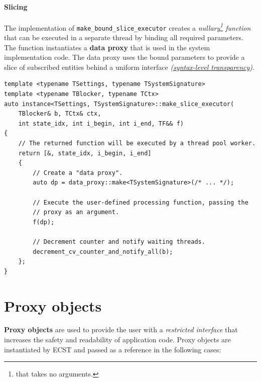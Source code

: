 \documentclass[twoside, 12pt, a4paper, openany]{book}
\begin{document}
\hypertarget{inner_par_slicing}{\subsubsection{Slicing}\label{inner_par_slicing}}

The implementation of
\texttt{make_bound_slice_executor}
creates a \emph{nullary\footnote{that takes no arguments.} function}
that can be executed in a separate thread by binding all required
parameters. The function instantiates a \textbf{data proxy} that is used
in the system implementation code. The data proxy uses the bound
parameters to provide a slice of subscribed entities behind a uniform
interface
\emph{(\protect\hyperlink{ecstoverview_syntaxtransp}{syntax-level
transparency})}.

\begin{verbatim}
template <typename TSettings, typename TSystemSignature>
template <typename TBlocker, typename TCtx>
auto instance<TSettings, TSystemSignature>::make_slice_executor(
    TBlocker& b, TCtx& ctx,
    int state_idx, int i_begin, int i_end, TF&& f)
{
    // The returned function will be executed by a thread pool worker.
    return [&, state_idx, i_begin, i_end]
    {
        // Create a "data proxy".
        auto dp = data_proxy::make<TSystemSignature>(/* ... */);

        // Execute the user-defined processing function, passing the
        // proxy as an argument.
        f(dp);

        // Decrement counter and notify waiting threads.
        decrement_cv_counter_and_notify_all(b);
    };
}
\end{verbatim}

\hypertarget{chap_proxies}{\chapter{Proxy objects}\label{chap_proxies}}

\textbf{Proxy objects} are used to provide the user with a
\emph{restricted interface} that increases the safety and readability of
application code. Proxy objects are instantiated by ECST and passed as a
reference in the following cases:
\end{document}
